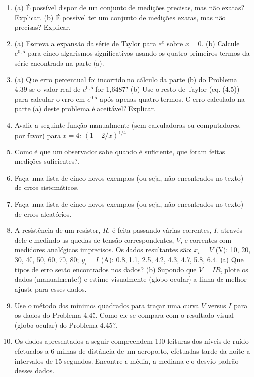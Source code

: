 \begin{enumerate}
    \item[\textbf{Problema 4.38.}] (a) É possível dispor de um conjunto de medições precisas, mas não exatas? Explicar. (b) É possível ter um conjunto de medições exatas, mas não precisas? Explicar.
    \item[\textbf{Problema 4.39.}] (a) Escreva a expansão da série de Taylor para $e^x$ sobre $x = 0$. (b) Calcule $e^{0,5}$ para cinco algarismos significativos usando os quatro primeiros termos da série encontrada na parte (a).
    \item[\textbf{Problema 4.40.}] (a) Que erro percentual foi incorrido no cálculo da parte (b) do Problema 4.39 se o valor real de $e^{0,5}$ for 1,6487? (b) Use o resto de Taylor (eq. (4.5)) para calcular o erro em $e^{0,5}$ após apenas quatro termos. O erro calculado na parte (a) deste problema é aceitável? Explicar.
    \item[\textbf{Problema 4.41.}] Avalie a seguinte função manualmente (sem calculadoras ou computadores, por favor) para $x = 4$: $(1 + 2/x)^{1/4}$.
    \item[\textbf{Problema 4.42.}] Como é que um observador sabe quando é suficiente, que foram feitas medições suficientes?.
    \item[\textbf{Problema 4.43.}] Faça uma lista de cinco novos exemplos (ou seja, não encontrados no texto) de erros sistemáticos.
    \item[\textbf{Problema 4.44.}] Faça uma lista de cinco novos exemplos (ou seja, não encontrados no texto) de erros aleatórios.
    \item[\textbf{Problema 4.45.}] A resistência de um resistor, $R$, é feita passando várias correntes, $I$, através dele e medindo as quedas de tensão correspondentes, $V$, e correntes com medidores analógicos imprecisos. Os dados resultantes são: $x_i = V$ (V): 10, 20, 30, 40, 50, 60, 70, 80; $y_i = I$ (A): 0.8, 1.1, 2.5, 4.2, 4.3, 4.7, 5.8, 6.4. (a) Que tipos de erro serão encontrados nos dados? (b) Supondo que $V = IR$, plote os dados (manualmente!) e estime visualmente (globo ocular) a linha de melhor ajuste para esses dados.
    \item[\textbf{Problema 4.46.}] Use o método dos mínimos quadrados para traçar uma curva $V$ versus $I$ para os dados do Problema 4.45. Como ele se compara com o resultado visual (globo ocular) do Problema 4.45?.
    \item[\textbf{Problema 4.47.}] Os dados apresentados a seguir compreendem 100 leituras dos níveis de ruído efetuados a 6 milhas de distância de um aeroporto, efetuadas tarde da noite a intervalos de 15 segundos. Encontre a média, a mediana e o desvio padrão desses dados.

\end{enumerate}
